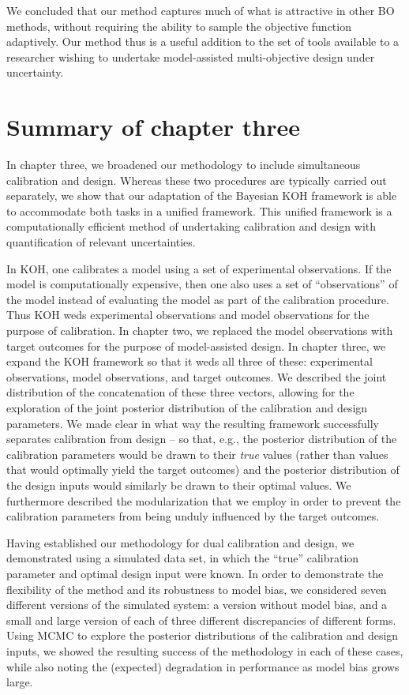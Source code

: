 \documentclass[12pt]{article}
\begin{document}
We concluded that our method captures much of what is attractive in other BO methods, without requiring the ability to sample the objective function adaptively.
Our method thus is a useful addition to the set of tools available to a researcher wishing to undertake model-assisted multi-objective design under uncertainty.

\section{Summary of chapter three}

In chapter three, we broadened our methodology to include simultaneous calibration and design.
Whereas these two procedures are typically carried out separately, we show that our adaptation of the Bayesian KOH framework is able to accommodate both tasks in a unified framework.
This unified framework is a computationally efficient method of undertaking calibration and design with quantification of relevant uncertainties.

In KOH, one calibrates a model using a set of experimental observations.
If the model is computationally expensive, then one also uses a set of ``observations'' of the model instead of evaluating the model as part of the calibration procedure.
Thus KOH weds experimental observations and model observations for the purpose of calibration.
In chapter two, we replaced the model observations with target outcomes for the purpose of model-assisted design.
In chapter three, we expand the KOH framework so that it weds all three of these: experimental observations, model observations, and target outcomes.
We described the joint distribution of the concatenation of these three vectors, allowing for the exploration of the joint posterior distribution of the calibration and design parameters.
We made clear in what way the resulting framework successfully separates calibration from design -- so that, e.g., the posterior distribution of the calibration parameters would be drawn to their \textit{true} values (rather than values that would optimally yield the target outcomes) and the posterior distribution of the design inputs would similarly be drawn to their optimal values.
We furthermore described the modularization \citep{Liu2009} that we employ in order to prevent the calibration parameters from being unduly influenced by the target outcomes.

Having established our methodology for dual calibration and design, we demonstrated using a simulated data set, in which the ``true'' calibration parameter and optimal design input were known.
In order to demonstrate the flexibility of the method and its robustness to model bias, we considered seven different versions of the simulated system: a version without model bias, and a small and large version of each of three different discrepancies of different forms.
Using MCMC to explore the posterior distributions of the calibration and design inputs, we showed the resulting success of the methodology in each of these cases, while also noting the (expected) degradation in performance as model bias grows large.
\end{document}

